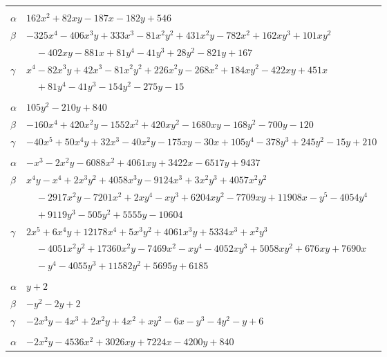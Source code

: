 \documentclass[11pt]{article}
\begin{document}
\begin{longtable}{@{}ll@{}}
\addlinespace[3pt]
\multicolumn{2}{@{}l}{$\{i,j\}=\{10,114\}$, $k_{ij}=2\cdot 3^{2}\cdot 7\cdot 13$}\\
$\alpha$ & $162x^{2}+82xy-187x-182y+546$\\
$\beta$ & $-325x^{4}-406x^{3}y+333x^{3}-81x^{2}y^{2}+431x^{2}y-782x^{2}+162xy^{3}+101xy^{2}$\\
 & $\quad -402xy-881x+81y^{4}-41y^{3}+28y^{2}-821y+167$\\
$\gamma$ & $x^{4}-82x^{3}y+42x^{3}-81x^{2}y^{2}+226x^{2}y-268x^{2}+184xy^{2}-422xy+451x$\\
 & $\quad +81y^{4}-41y^{3}-154y^{2}-275y-15$\\
\addlinespace[3pt]
\multicolumn{2}{@{}l}{$\{i,j\}=\{10,196\}$, $k_{ij}=2^{3}\cdot 3^{2}\cdot 5\cdot 7$}\\
$\alpha$ & $105y^{2}-210y+840$\\
$\beta$ & $-160x^{4}+420x^{2}y-1552x^{2}+420xy^{2}-1680xy-168y^{2}-700y-120$\\
$\gamma$ & $-40x^{5}+50x^{4}y+32x^{3}-40x^{2}y-175xy-30x+105y^{4}-378y^{3}+245y^{2}-15y+210$\\
\addlinespace[3pt]
\multicolumn{2}{@{}l}{$\{i,j\}=\{11,12\}$, $k_{ij}=2^{6}\cdot 7^{2}\cdot 11$}\\
$\alpha$ & $-x^{3}-2x^{2}y-6088x^{2}+4061xy+3422x-6517y+9437$\\
$\beta$ & $x^{4}y-x^{4}+2x^{3}y^{2}+4058x^{3}y-9124x^{3}+3x^{2}y^{3}+4057x^{2}y^{2}$\\
 & $\quad -2917x^{2}y-7201x^{2}+2xy^{4}-xy^{3}+6204xy^{2}-7709xy+11908x-y^{5}-4054y^{4}$\\
 & $\quad +9119y^{3}-505y^{2}+5555y-10604$\\
$\gamma$ & $2x^{5}+6x^{4}y+12178x^{4}+5x^{3}y^{2}+4061x^{3}y+5334x^{3}+x^{2}y^{3}$\\
 & $\quad -4051x^{2}y^{2}+17360x^{2}y-7469x^{2}-xy^{4}-4052xy^{3}+5058xy^{2}+676xy+7690x$\\
 & $\quad -y^{4}-4055y^{3}+11582y^{2}+5695y+6185$\\
\addlinespace[3pt]
\multicolumn{2}{@{}l}{$\{i,j\}=\{12,41\}$, $k_{ij}=2\cdot 7$}\\
$\alpha$ & $y+2$\\
$\beta$ & $-y^{2}-2y+2$\\
$\gamma$ & $-2x^{3}y-4x^{3}+2x^{2}y+4x^{2}+xy^{2}-6x-y^{3}-4y^{2}-y+6$\\
\addlinespace[3pt]
\multicolumn{2}{@{}l}{$\{i,j\}=\{12,63\}$, $k_{ij}=2^{7}\cdot 3\cdot 7^{2}$}\\
$\alpha$ & $-2x^{2}y-4536x^{2}+3026xy+7224x-4200y+840$\\

\end{longtable}
\end{document}
